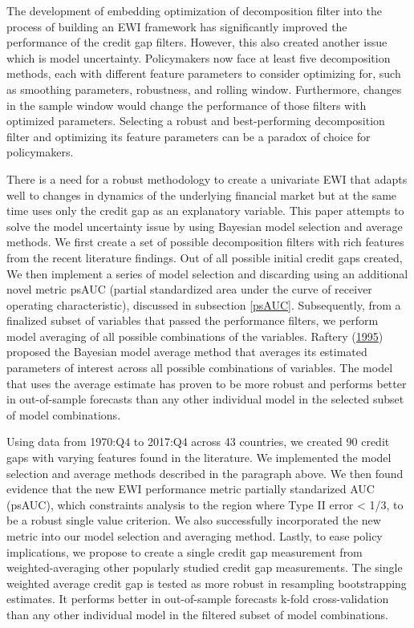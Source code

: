 \documentclass[
  12pt,
]{article}
\begin{document}
The development of embedding optimization of decomposition filter into the process of building an EWI framework has significantly improved the performance of the credit gap filters. However, this also created another issue which is model uncertainty. Policymakers now face at least five decomposition methods, each with different feature parameters to consider optimizing for, such as smoothing parameters, robustness, and rolling window. Furthermore, changes in the sample window would change the performance of those filters with optimized parameters. Selecting a robust and best-performing decomposition filter and optimizing its feature parameters can be a paradox of choice for policymakers.

There is a need for a robust methodology to create a univariate EWI that adapts well to changes in dynamics of the underlying financial market but at the same time uses only the credit gap as an explanatory variable. This paper attempts to solve the model uncertainty issue by using Bayesian model selection and average methods. We first create a set of possible decomposition filters with rich features from the recent literature findings. Out of all possible initial credit gaps created, We then implement a series of model selection and discarding using an additional novel metric psAUC (partial standardized area under the curve of receiver operating characteristic), discussed in subsection \ref{psAUC}. Subsequently, from a finalized subset of variables that passed the performance filters, we perform model averaging of all possible combinations of the variables. Raftery (\protect\hyperlink{ref-raftery_bayesian_1995}{1995}) proposed the Bayesian model average method that averages its estimated parameters of interest across all possible combinations of variables. The model that uses the average estimate has proven to be more robust and performs better in out-of-sample forecasts than any other individual model in the selected subset of model combinations.

Using data from 1970:Q4 to 2017:Q4 across 43 countries, we created 90 credit gaps with varying features found in the literature. We implemented the model selection and average methods described in the paragraph above. We then found evidence that the new EWI performance metric partially standarized AUC (psAUC), which constraints analysis to the region where Type II error \textless{} 1/3, to be a robust single value criterion. We also successfully incorporated the new metric into our model selection and averaging method. Lastly, to ease policy implications, we propose to create a single credit gap measurement from weighted-averaging other popularly studied credit gap measurements. The single weighted average credit gap is tested as more robust in resampling bootstrapping estimates. It performs better in out-of-sample forecasts k-fold cross-validation than any other individual model in the filtered subset of model combinations.
\end{document}
